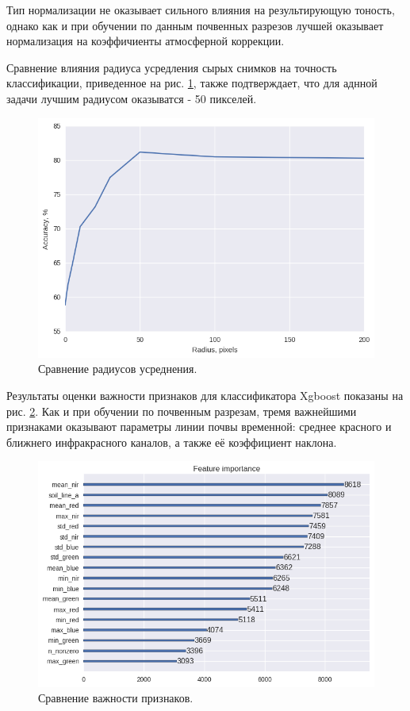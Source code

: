 \documentclass[14pt]{extarticle}
\begin{document}
Тип нормализации не оказывает сильного влияния на результирующую тоность, однако как и 
при обучении по данным почвенных разрезов лучшей оказывает нормализация на коэффичиенты
атмосферной коррекции.
\par
Сравнение влияния радиуса усредления сырых снимков на точность классификации, приведенное на
рис. \ref{image:map_radius}, также подтверждает, что для аднной задачи лучшим радиусом оказыватся -
50 пикселей.
\begin{figure}[H]
\centering
\includegraphics[width=\linewidth]{imgs/map_radius.png}
\caption{Сравнение радиусов усреднения.}
\label{image:map_radius}
\end{figure}
\par
Результаты оценки важности признаков для классификатора Xgboost показаны на рис. 
\ref{image:map_importance}. Как и при обучении по почвенным разрезам, тремя важнейшими
признаками оказывают параметры линии почвы временной: среднее красного и ближнего инфракрасного
каналов, а также её коэффициент наклона.
\begin{figure}[H]
\centering
\includegraphics[width=\linewidth]{imgs/map_importance.png}
\caption{Сравнение важности признаков.}
\label{image:map_importance}
\end{figure}
\end{document}
